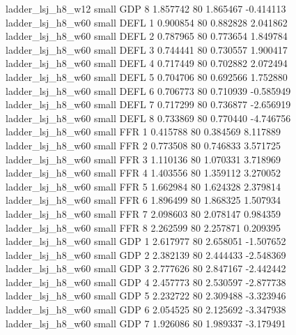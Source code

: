        ladder_lsj_h8_w12      small      GDP                 8 1.857742 80       1.865467          -0.414113
       ladder_lsj_h8_w60      small     DEFL                 1 0.900854 80       0.882828           2.041862
       ladder_lsj_h8_w60      small     DEFL                 2 0.787965 80       0.773654           1.849784
       ladder_lsj_h8_w60      small     DEFL                 3 0.744441 80       0.730557           1.900417
       ladder_lsj_h8_w60      small     DEFL                 4 0.717449 80       0.702882           2.072494
       ladder_lsj_h8_w60      small     DEFL                 5 0.704706 80       0.692566           1.752880
       ladder_lsj_h8_w60      small     DEFL                 6 0.706773 80       0.710939          -0.585949
       ladder_lsj_h8_w60      small     DEFL                 7 0.717299 80       0.736877          -2.656919
       ladder_lsj_h8_w60      small     DEFL                 8 0.733869 80       0.770440          -4.746756
       ladder_lsj_h8_w60      small      FFR                 1 0.415788 80       0.384569           8.117889
       ladder_lsj_h8_w60      small      FFR                 2 0.773508 80       0.746833           3.571725
       ladder_lsj_h8_w60      small      FFR                 3 1.110136 80       1.070331           3.718969
       ladder_lsj_h8_w60      small      FFR                 4 1.403556 80       1.359112           3.270052
       ladder_lsj_h8_w60      small      FFR                 5 1.662984 80       1.624328           2.379814
       ladder_lsj_h8_w60      small      FFR                 6 1.896499 80       1.868325           1.507934
       ladder_lsj_h8_w60      small      FFR                 7 2.098603 80       2.078147           0.984359
       ladder_lsj_h8_w60      small      FFR                 8 2.262599 80       2.257871           0.209395
       ladder_lsj_h8_w60      small      GDP                 1 2.617977 80       2.658051          -1.507652
       ladder_lsj_h8_w60      small      GDP                 2 2.382139 80       2.444433          -2.548369
       ladder_lsj_h8_w60      small      GDP                 3 2.777626 80       2.847167          -2.442442
       ladder_lsj_h8_w60      small      GDP                 4 2.457773 80       2.530597          -2.877738
       ladder_lsj_h8_w60      small      GDP                 5 2.232722 80       2.309488          -3.323946
       ladder_lsj_h8_w60      small      GDP                 6 2.054525 80       2.125692          -3.347938
       ladder_lsj_h8_w60      small      GDP                 7 1.926086 80       1.989337          -3.179491
